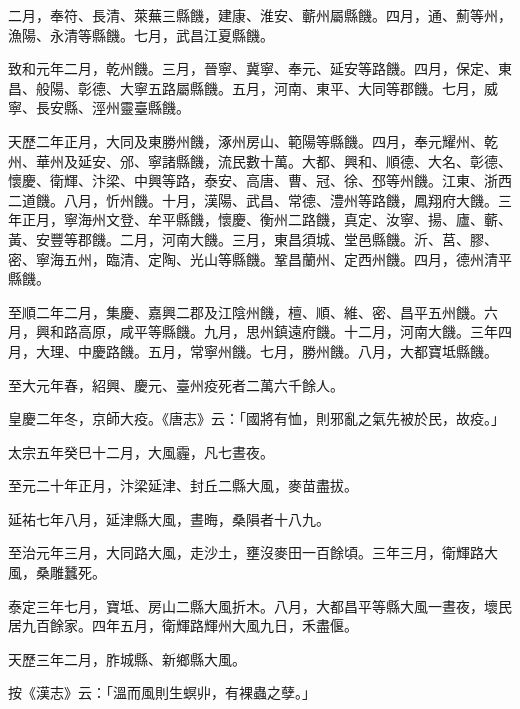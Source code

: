 \begin{pinyinscope}
 二月，奉符、長清、萊蕪三縣饑，建康、淮安、蘄州屬縣饑。四月，通、薊等州，漁陽、永清等縣饑。七月，武昌江夏縣饑。



 致和元年二月，乾州饑。三月，晉寧、冀寧、奉元、延安等路饑。四月，保定、東昌、般陽、彰德、大寧五路屬縣饑。五月，河南、東平、大同等郡饑。七月，威寧、長安縣、涇州靈臺縣饑。



 天歷二年正月，大同及東勝州饑，涿州房山、範陽等縣饑。四月，奉元耀州、乾州、華州及延安、邠、寧諸縣饑，流民數十萬。大都、興和、順德、大名、彰德、懷慶、衛輝、汴梁、中興等路，泰安、高唐、曹、冠、徐、邳等州饑。江東、浙西二道饑。八月，忻州饑。十月，漢陽、武昌、常德、澧州等路饑，鳳翔府大饑。三年正月，寧海州文登、牟平縣饑，懷慶、衡州二路饑，真定、汝寧、揚、廬、蘄、黃、安豐等郡饑。二月，河南大饑。三月，東昌須城、堂邑縣饑。沂、莒、膠、密、寧海五州，臨清、定陶、光山等縣饑。鞏昌蘭州、定西州饑。四月，德州清平縣饑。



 至順二年二月，集慶、嘉興二郡及江陰州饑，檀、順、維、密、昌平五州饑。六月，興和路高原，咸平等縣饑。九月，思州鎮遠府饑。十二月，河南大饑。三年四月，大理、中慶路饑。五月，常寧州饑。七月，勝州饑。八月，大都寶坻縣饑。



 至大元年春，紹興、慶元、臺州疫死者二萬六千餘人。



 皇慶二年冬，京師大疫。《唐志》云：「國將有恤，則邪亂之氣先被於民，故疫。」



 太宗五年癸巳十二月，大風霾，凡七晝夜。



 至元二十年正月，汴梁延津、封丘二縣大風，麥苗盡拔。



 延祐七年八月，延津縣大風，晝晦，桑隕者十八九。



 至治元年三月，大同路大風，走沙土，壅沒麥田一百餘頃。三年三月，衛輝路大風，桑雕蠶死。



 泰定三年七月，寶坻、房山二縣大風折木。八月，大都昌平等縣大風一晝夜，壞民居九百餘家。四年五月，衛輝路輝州大風九日，禾盡偃。



 天歷三年二月，胙城縣、新鄉縣大風。



 按《漢志》云：「溫而風則生螟丱，有裸蟲之孽。」




\end{pinyinscope}
